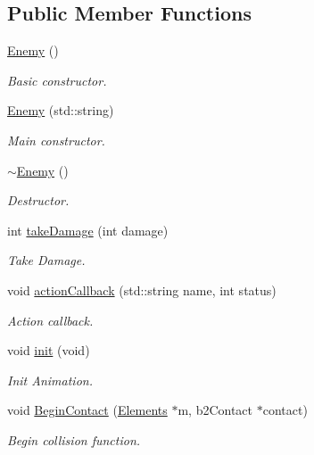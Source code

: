 \subsection*{Public Member Functions}
\begin{DoxyCompactItemize}
\item 
\hyperlink{class_enemy_a94f30d348b6d2840fd71675472ba38dd}{Enemy} ()
\begin{DoxyCompactList}\small\item\em Basic constructor. \end{DoxyCompactList}\item 
\hyperlink{class_enemy_a258ddb71f2f298663dc1ff988dcfd2e2}{Enemy} (std\+::string)
\begin{DoxyCompactList}\small\item\em Main constructor. \end{DoxyCompactList}\item 
\hyperlink{class_enemy_ac0eec4755e28c02688065f9657150ac3}{$\sim$\+Enemy} ()
\begin{DoxyCompactList}\small\item\em Destructor. \end{DoxyCompactList}\item 
int \hyperlink{class_enemy_ae4335909ac929e5e5db7eb01b15fbce8}{take\+Damage} (int damage)
\begin{DoxyCompactList}\small\item\em Take Damage. \end{DoxyCompactList}\item 
void \hyperlink{class_enemy_a2f1157b7c8d74371c2b06493563423ee}{action\+Callback} (std\+::string name, int status)
\begin{DoxyCompactList}\small\item\em Action callback. \end{DoxyCompactList}\item 
void \hyperlink{class_enemy_a4ed496f92f8c791133494d24b4eeaff6}{init} (void)
\begin{DoxyCompactList}\small\item\em Init Animation. \end{DoxyCompactList}\item 
void \hyperlink{class_enemy_a3938e3e2cf5f07d809e1f1927b09539a}{Begin\+Contact} (\hyperlink{class_elements}{Elements} $\ast$m, b2\+Contact $\ast$contact)
\begin{DoxyCompactList}\small\item\em Begin collision function. \end{DoxyCompactList}\end{DoxyCompactItemize}
